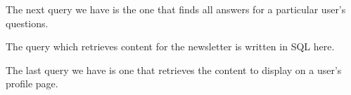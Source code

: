 
The next query we have is the one that finds all answers for a particular user's questions.


The query which retrieves content for the newsletter is written in SQL here.


The last query we have is one that retrieves the content to display on a user's profile page.

